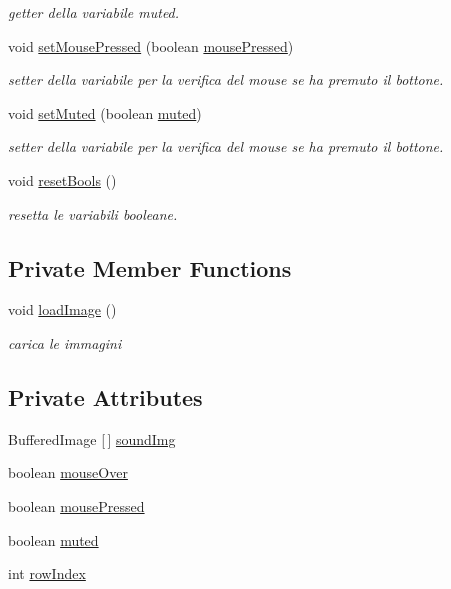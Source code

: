 \begin{DoxyCompactItemize}
\begin{DoxyCompactList}\small\item\em getter della variabile muted. \end{DoxyCompactList}\item 
void \hyperlink{classui_1_1_sound_button_ad6f3328519bbc954f7973bc885d088d8}{set\+Mouse\+Pressed} (boolean \hyperlink{classui_1_1_sound_button_aab61081d8be401bc3a4081ae11fb50d9}{mouse\+Pressed})
\begin{DoxyCompactList}\small\item\em setter della variabile per la verifica del mouse se ha premuto il bottone. \end{DoxyCompactList}\item 
void \hyperlink{classui_1_1_sound_button_a9dfe6f9f7337d35cf2e6624259b72134}{set\+Muted} (boolean \hyperlink{classui_1_1_sound_button_a1d5ea61013609113129f4a6aaa99c5cd}{muted})
\begin{DoxyCompactList}\small\item\em setter della variabile per la verifica del mouse se ha premuto il bottone. \end{DoxyCompactList}\item 
void \hyperlink{classui_1_1_sound_button_a4506144774b5a18385cf2eb0f4ff5e42}{reset\+Bools} ()
\begin{DoxyCompactList}\small\item\em resetta le variabili booleane. \end{DoxyCompactList}\end{DoxyCompactItemize}
\subsection*{Private Member Functions}
\begin{DoxyCompactItemize}
\item 
void \hyperlink{classui_1_1_sound_button_aeee4cf1bbe51fdc2f9c344e4c20cee76}{load\+Image} ()
\begin{DoxyCompactList}\small\item\em carica le immagini \end{DoxyCompactList}\end{DoxyCompactItemize}
\subsection*{Private Attributes}
\begin{DoxyCompactItemize}
\item 
Buffered\+Image \mbox{[}$\,$\mbox{]} \hyperlink{classui_1_1_sound_button_a6bfb47041497c4df05a45081b935f60b}{sound\+Img}
\item 
boolean \hyperlink{classui_1_1_sound_button_a9659ce063fb98f78eefb2ee148d1e9fc}{mouse\+Over}
\item 
boolean \hyperlink{classui_1_1_sound_button_aab61081d8be401bc3a4081ae11fb50d9}{mouse\+Pressed}
\item 
boolean \hyperlink{classui_1_1_sound_button_a1d5ea61013609113129f4a6aaa99c5cd}{muted}
\item 
int \hyperlink{classui_1_1_sound_button_aa472bc4708470ef0afc61d3c18896ec9}{row\+Index}
\end{DoxyCompactItemize}
